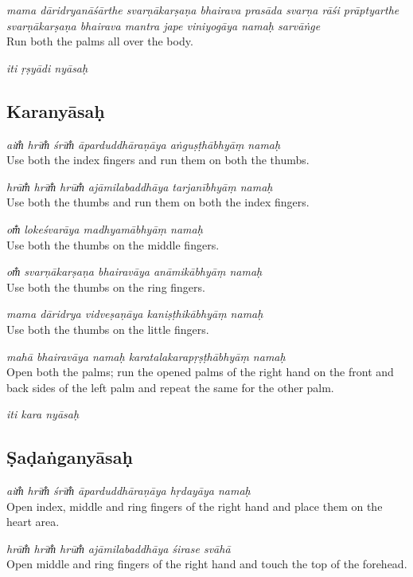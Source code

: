 \documentclass[12pt,oneside,a4paper]{article}
\newenvironment{shloka}[1]
  {\bigskip\center#1\varwidth{\linewidth}}
  {\endvarwidth\endcenter\bigskip}
\newcommand{\tl}[1]{\emph{#1}}
\begin{document}
\tl{mama dāridryanāśārthe svarṇākarṣaṇa
bhairava prasāda svarṇa rāśi prāptyarthe svarṇākarṣaṇa bhairava mantra jape
viniyogāya namaḥ sarvāṅge}\\
Run both the palms all over the body.

\begin{shloka}\itshape
  iti ṛṣyādi nyāsaḥ
\end{shloka}

\subsection{Karanyāsaḥ}

\tl{aim̐ hrīm̐ śrīm̐ āparduddhāraṇāya aṅguṣṭhābhyāṃ namaḥ}\\
Use both the index fingers and run them on both the thumbs.

\tl{hrām̐ hrīm̐ hrūm̐ ajāmilabaddhāya tarjanībhyāṃ namaḥ}\\
Use both the thumbs and run them on both the index fingers.

\tl{om̐ lokeśvarāya madhyamābhyāṃ namaḥ}\\
Use both the thumbs on the middle fingers.

\tl{om̐ svarṇākarṣaṇa bhairavāya anāmikābhyāṃ namaḥ}\\
Use both the thumbs on the ring fingers.

\tl{mama dāridrya vidveṣaṇāya kaniṣṭhikābhyāṃ namaḥ}\\
Use both the thumbs on the little fingers.

\tl{mahā bhairavāya namaḥ karatalakarapṛṣṭhābhyāṃ namaḥ}\\
Open both the palms; run the opened palms of the right hand on the front and
back sides of the left palm and repeat the same for the other palm.

\begin{shloka}\itshape
  iti kara nyāsaḥ
\end{shloka}

\subsection{Ṣaḍaṅganyāsaḥ}

\tl{aim̐ hrīm̐ śrīm̐ āparduddhāraṇāya hṛdayāya namaḥ}\\
Open index, middle and ring fingers of the right hand and place them on
the heart area.

\tl{hrām̐ hrīm̐ hrūm̐ ajāmilabaddhāya śirase svāhā}\\
Open middle and ring fingers of the right hand and touch the top of
the forehead.
\end{document}
